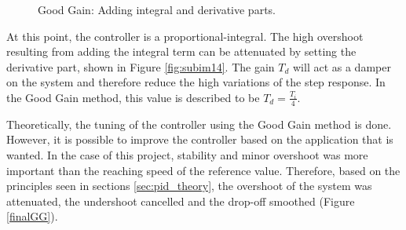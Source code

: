 \begin{figure}[H]
\hfill
{}
\hfill
{}
\hfill

\caption{Good Gain: Adding integral and derivative parts.}
\end{figure}

At this point, the controller is a proportional-integral. The high overshoot resulting from adding the integral term can be attenuated by setting the derivative part, shown in Figure \ref{fig:subim14}. The gain $T_d$ will act as a damper on the system and therefore reduce the high variations of the step response. In the Good Gain method, this value is described to be $T_d = \frac{T_i}{4}$.

\vspace{5mm}

Theoretically, the tuning of the controller using the Good Gain method is done. However, it is possible to improve the controller based on the application that is wanted. In the case of this project, stability and minor overshoot was more important than the reaching speed of the reference value. Therefore, based on the principles seen in sections \ref{sec:pid_theory}, the overshoot of the system was attenuated, the undershoot cancelled and the drop-off smoothed (Figure \ref{finalGG}).

